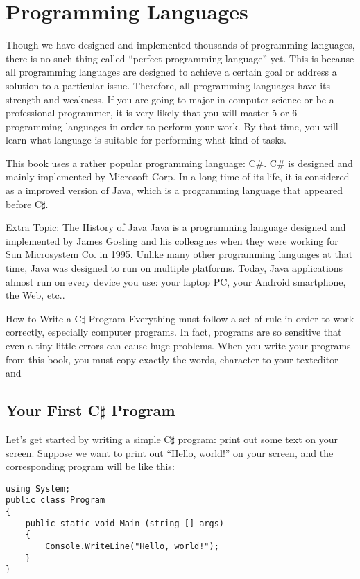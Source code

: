 \documentclass[../main.tex]{subfiles}
\begin{document}
\section{Programming Languages}
Though we have designed and implemented thousands of programming languages,
there is no such thing called ``perfect programming language'' yet. This is
because all programming languages are designed to achieve a certain goal or
address a solution to a particular issue. Therefore, all programming languages
have its strength and weakness. If you are going to major in computer science or
be a professional programmer, it is very likely that you will master 5 or 6
programming languages in order to perform your work. By that time, you will
learn what language is suitable for performing what kind of tasks.

This book uses a rather popular programming language: C\#. C\# is designed and
mainly implemented by Microsoft Corp. In a long time of its life, it is
considered as a improved version of Java, which is a programming language that
appeared before C$\sharp$.

Extra Topic: The History of Java
Java is a programming language designed and implemented by James Gosling and his
colleagues when they were working for Sun Microsystem Co. in 1995. Unlike many
other programming languages at that time, Java was designed to run on multiple
platforms. Today, Java applications almost run on every device you use: your
laptop PC, your Android smartphone, the Web, etc..

How to Write a C$\sharp$ Program
Everything must follow a set of rule in order to work correctly, especially
computer programs. In fact, programs are so sensitive that even a tiny little
errors can cause huge problems. When you write your programs from this book,
you must copy exactly the words, character to your texteditor and


\subsection{Your First C$\sharp$ Program}
Let's get started by writing a simple C$\sharp$ program: print out some text on
your screen. Suppose we want to print out ``Hello, world!'' on your screen, and
the corresponding program will be like this:

\begin{verbatim}
using System;
public class Program
{
    public static void Main (string [] args)
    {
        Console.WriteLine("Hello, world!");
    }
}
\end{verbatim}
\end{document}
